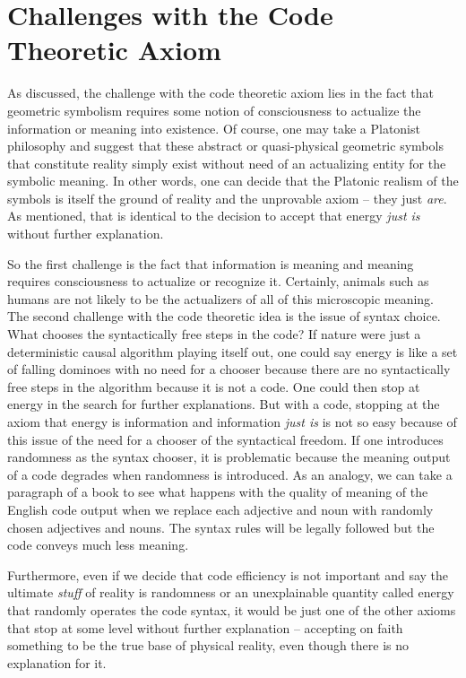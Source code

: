 \documentclass[submission,copyright,creativecommons]{eptcs}
\begin{document}
\section{Challenges with the Code Theoretic Axiom}
\label{sec:5}

As discussed, the challenge with the code theoretic axiom lies in the fact that geometric symbolism requires some notion of consciousness to actualize the information or meaning into existence. Of course, one may take a Platonist philosophy and suggest that these abstract or quasi-physical geometric symbols that constitute reality simply exist without need of an actualizing entity for the symbolic meaning. In other words, one can decide that the Platonic realism of the symbols is itself the ground of reality and the unprovable axiom -- they just \textit{are}. As mentioned, that is identical to the decision to accept that energy \textit{just is} without further explanation.

So the first challenge is the fact that information is meaning and meaning requires consciousness to actualize or recognize it. Certainly, animals such as humans are not likely to be the actualizers of all of this microscopic meaning. The second challenge with the code theoretic idea is the issue of syntax choice. What chooses the syntactically free steps in the code? If nature were just a deterministic causal algorithm playing itself out, one could say energy is like a set of falling dominoes with no need for a chooser because there are no syntactically free steps in the algorithm because it is not a code. One could then stop at energy in the search for further explanations. But with a code, stopping at the axiom that energy is information and information \textit{just is} is not so easy because of this issue of the need for a chooser of the syntactical freedom. If one introduces randomness as the syntax chooser, it is problematic because the meaning output of a code degrades when randomness is introduced. As an analogy, we can take a paragraph of a book to see what happens with the quality of meaning of the English code output when we replace each adjective and noun with randomly chosen adjectives and nouns. The syntax rules will be legally followed but the code conveys much less meaning.

Furthermore, even if we decide that code efficiency is not important and say the ultimate \textit{stuff} of reality is randomness or an unexplainable quantity called energy that randomly operates the code syntax, it would be just one of the other axioms that stop at some level without further explanation -- accepting on faith something to be the true base of physical reality, even though there is no explanation for it.
\end{document}
